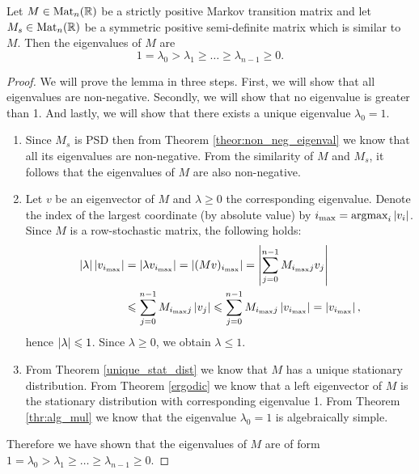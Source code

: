 \begin{lemma}
    Let $M\in\text{Mat}_n(\mathbb{R})$ be a strictly positive Markov transition matrix and let \linebreak $M_s\in\text{Mat}_n(\mathbb{R})$ be a symmetric positive semi-definite matrix which is similar to $M$. Then the eigenvalues of $M$ are $$1=\lambda_0 > \lambda_1 \geq \dots \geq \lambda_{n-1}\geq 0.$$
\end{lemma}
\begin{proof}
    We will prove the lemma in three steps. First, we will show that all eigenvalues are non-negative. Secondly, we will show that no eigenvalue is greater than 1. And lastly, we will show that there exists a unique eigenvalue $\lambda_0=1$.
    \begin{enumerate}
        \renewcommand{\labelenumi}{\arabic{enumi}.}
        \item Since $M_s$ is PSD then from Theorem \ref{theor:non_neg_eigenval} we know that all its eigenvalues are non-negative. From the similarity of $M$ and $M_s$, it follows that the eigenvalues of $M$ are also non-negative.

        \item Let $v$ be an eigenvector of $M$ and $\lambda\geq0$ the corresponding eigenvalue. Denote the index of the largest coordinate (by absolute value) by  $i_{\max} = \text{argmax}_i\left|v_i\right|$. Since $M$ is a row-stochastic matrix, the following holds:
        \begin{align*}
            \left|\lambda\right|\left|v_{i_{\max}}\right| & =\left|\lambda v_{i_{\max}}\right|=\left|(Mv)_{i_{\max}}\right| = \left|\sum\limits_{j=0}^{n-1}M_{i_{\max}j}v_j\right| \\
            & \leqslant \sum\limits_{j=0}^{n-1}M_{i_{\max}j}\left|v_j\right| \leqslant \sum\limits_{j=0}^{n-1}M_{i_{\max}j}\left|v_{i_{\max}}\right| = \left|v_{i_{\max}}\right|,
        \end{align*}
        hence $\left|\lambda\right|\leqslant 1$. Since $\lambda\geq 0$, we obtain $\lambda\leq 1$.

        \item From Theorem \ref{unique_stat_dist} we know that $M$ has a unique stationary distribution. From Theorem \ref{ergodic} we know that a left eigenvector of $M$ is the stationary distribution with corresponding eigenvalue 1. From Theorem \ref{thr:alg_mul} we know that the eigenvalue $\lambda_0=1$ is algebraically simple.
    \end{enumerate}
    Therefore we have shown that the eigenvalues of $M$ are of form $1=\lambda_0 > \lambda_1 \geq \dots \geq \lambda_{n-1}\geq 0$.
\end{proof}

